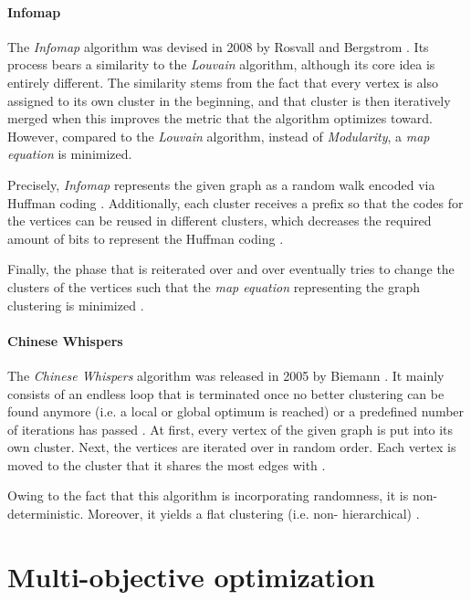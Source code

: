 \documentclass[12pt,a4paper]{report}
\begin{document}
\paragraph{Infomap \cite{rosvall2008infomap}}
The \textit{Infomap} algorithm
was devised in 2008 by Rosvall and Bergstrom \cite{rosvall2008infomap}. Its
process bears a similarity to the \textit{Louvain} algorithm, although its core
idea is entirely different. The similarity stems from the fact that every
vertex is also assigned to its own cluster in the beginning, and that cluster
is then iteratively merged when this improves the metric that the algorithm
optimizes toward. However, compared to the \textit{Louvain} algorithm, instead
of \textit{Modularity}, a \textit{map equation} is minimized.

Precisely, \textit{Infomap} represents the given graph as a random walk encoded
via Huffman coding \cite{huffman1952coding}. Additionally, each cluster
receives a prefix so that the codes for the vertices can be reused in different
clusters, which decreases the required amount of bits to represent the Huffman
coding \cite{rosvall2008infomap}.

Finally, the phase that is reiterated over and over eventually tries to change
the clusters of the vertices such that the \textit{map equation} representing
the graph clustering is minimized \cite{rosvall2008infomap}.

\paragraph{Chinese Whispers \cite{biemann2006chinese}}
The \textit{Chinese Whispers} algorithm was released in 2005 by Biemann
\cite{biemann2006chinese}.
It mainly consists of an endless loop that is terminated once no better
clustering can be found anymore (i.e. a local or global optimum is reached) or
a predefined number of iterations has passed \cite{biemann2006chinese}. At
first, every vertex of the given graph is put into its own cluster. Next, the
vertices are iterated over in random order. Each vertex is moved to the cluster
that it shares the most edges with \cite{biemann2006chinese}.

Owing to the fact that this algorithm is incorporating randomness, it is
non\hyp deterministic. Moreover, it yields a flat clustering (i.e. non\hyp
hierarchical) \cite{biemann2006chinese}.


\section{Multi-objective optimization}
\end{document}
